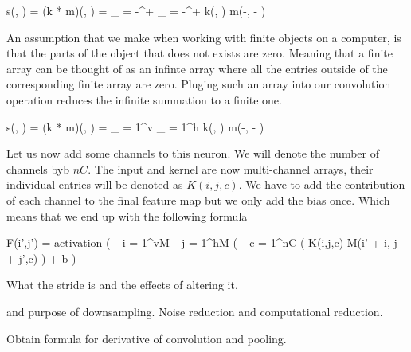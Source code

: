 \startplaceformula[reference=twodim-discconv]
\startformula
s(\color[red]{i}, \color[blue]{i}) = (k * m)(\color[red]{i}, \color[blue]{i}) = \sum_{\color[red]{j} = {-}\infty}^{{+}\infty} \sum_{\color[blue]{j} = {-}\infty}^{{+}\infty} k(\color[red]{j}, \color[blue]{j}) \cdot m(\color[red]{i}-\color[red]{j}, \color[blue]{i} - \color[blue]{j})
\stopformula
\stopplaceformula

An assumption that we make when working with finite objects on a computer, is that the parts of the object that does not exists are zero.
Meaning that a finite array can be thought of as an infinte array where all the entries outside of the corresponding finite array are zero.
Pluging such an array into our convolution operation reduces the infinite summation to a finite one.

\startplaceformula[reference=twodim-discconv-finite]
\startformula
s(\color[red]{i}, \color[blue]{i}) = (k * m)(\color[red]{i}, \color[blue]{i}) = \sum_{\color[red]{j} = 1}^{v} \sum_{\color[blue]{j} = 1}^{h} k(\color[red]{j}, \color[blue]{j}) \cdot m(\color[red]{i}-\color[red]{j}, \color[blue]{i} - \color[blue]{j})
\stopformula
\stopplaceformula

\stopsubsubsection

\startsubsubsection[title=Multiple channels]
Let us now add some channels to this neuron.
We will denote the number of channels byb $nC$.
The input and kernel are now multi-channel arrays, their individual entries will be denoted as $K(i,j,c)$.
We have to add the contribution of each channel to the final feature map but we only add the bias once.
Which means that we end up with the following formula

\startplaceformula
\startformula
F(i',j') = {\rm activation} \left( \sum_{i = 1}^{vM} \sum_{j = 1}^{hM} \left( \sum_{c = 1}^{nC} \Bigl( K(i,j,c) \cdot M(i' + i, j + j',c) \right) + b \right)
\stopformula
\stopplaceformula
\stopsubsubsection

\startsubsubsection[title=The stride]
What the stride is and the effects of altering it.
\stopsubsubsection

\startsubsubsection[title=Zero padding]
\stopsubsubsection



 and purpose of downsampling.
Noise reduction and computational reduction.
\stopsubsection

\startsubsection[title=Backward Propagation]
Obtain formula for derivative of convolution and pooling.
\stopsubsection
\stopsection